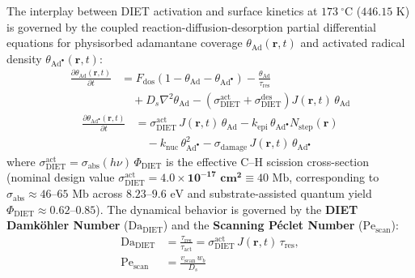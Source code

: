 \documentclass[10pt,twocolumn,a4paper]{article}
\begin{document}
The interplay between DIET activation and surface kinetics at $173\ ^\circ\text{C}$ ($446.15\text{ K}$) is governed by the coupled reaction-diffusion-desorption partial differential equations for physisorbed adamantane coverage $\theta_{\text{Ad}}(\mathbf{r},t)$ and activated radical density $\theta_{\text{Ad}^\bullet}(\mathbf{r},t)$:
\begin{equation}
\begin{split}
\frac{\partial \theta_{\text{Ad}}(\mathbf{r},t)}{\partial t} &= F_{\text{dos}}\left(1 - \theta_{\text{Ad}} - \theta_{\text{Ad}^\bullet}\right) - \frac{\theta_{\text{Ad}}}{\tau_{\text{res}}} \\
&\quad + D_s \nabla^2 \theta_{\text{Ad}} - \left(\sigma_{\text{DIET}}^{\text{act}} + \sigma_{\text{DIET}}^{\text{des}}\right) J(\mathbf{r},t)\,\theta_{\text{Ad}}
\end{split}
\end{equation}
\begin{equation}
\begin{split}
\frac{\partial \theta_{\text{Ad}^\bullet}(\mathbf{r},t)}{\partial t} &= \sigma_{\text{DIET}}^{\text{act}}\,J(\mathbf{r},t)\,\theta_{\text{Ad}} - k_{\text{epi}}\,\theta_{\text{Ad}^\bullet} N_{\text{step}}(\mathbf{r}) \\
&\quad - k_{\text{nuc}}\,\theta_{\text{Ad}^\bullet}^2 - \sigma_{\text{damage}}\,J(\mathbf{r},t)\,\theta_{\text{Ad}^\bullet}
\end{split}
\end{equation}
where $\sigma_{\text{DIET}}^{\text{act}} = \sigma_{\text{abs}}(h\nu)\,\Phi_{\text{DIET}}$ is the effective $\text{C--H}$ scission cross-section (nominal design value $\sigma_{\text{DIET}}^{\text{act}} = \mathbf{4.0 \times 10^{-17}\text{ cm}^2} \equiv 40\text{ Mb}$, corresponding to $\sigma_{\text{abs}} \approx 46\text{--}65\text{ Mb}$ across $8.23\text{--}9.6\text{ eV}$ \cite{Marder2023} and substrate-assisted quantum yield $\Phi_{\text{DIET}} \approx 0.62\text{--}0.85$). The dynamical behavior is governed by the \textbf{DIET Damköhler Number} ($\text{Da}_{\text{DIET}}$) and the \textbf{Scanning Péclet Number} ($\text{Pe}_{\text{scan}}$):
\begin{equation}
\begin{split}
\text{Da}_{\text{DIET}} &= \frac{\tau_{\text{res}}}{\tau_{\text{act}}} = \sigma_{\text{DIET}}^{\text{act}}\,J(\mathbf{r},t)\,\tau_{\text{res}}, \\
\text{Pe}_{\text{scan}} &= \frac{v_{\text{scan}}\,w_b}{D_s}
\end{split}
\end{equation}
\end{document}
